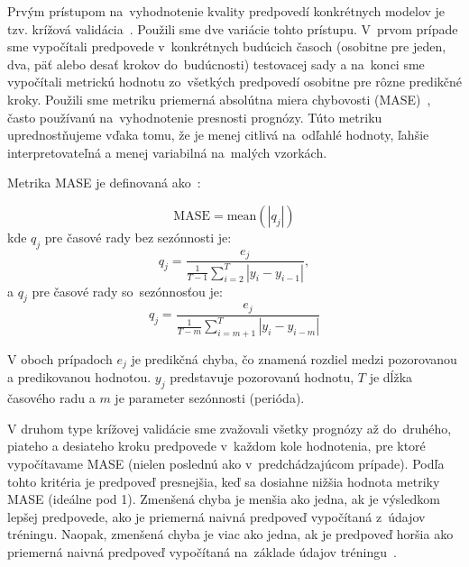 \documentclass[thesismargins, thesislinespacing, openright, upjsfrontpage]{rnthesis}
\begin{document}

Prvým prístupom na~vyhodnotenie kvality predpovedí konkrétnych modelov je tzv. krížová validácia~\cite {hyndman2018forecasting}. Použili sme dve variácie tohto prístupu. V~prvom prípade sme vypočítali predpovede v~konkrétnych budúcich časoch (osobitne pre jeden, dva, päť alebo desať krokov do~budúcnosti) testovacej sady a na~konci sme vypočítali metrickú hodnotu zo~všetkých predpovedí osobitne pre rôzne predikčné kroky. Použili sme metriku priemerná absolútna miera chybovosti (MASE)~\cite{hyndman2006another}, často používanú na~vyhodnotenie presnosti prognózy. Túto metriku uprednostňujeme vďaka tomu, že je menej citlivá na~odľahlé hodnoty, ľahšie interpretovateľná a menej variabilná na~malých vzorkách.

Metrika MASE je definovaná ako~\cite{hyndman2018forecasting}:

% 
\begin{equation}
\textrm{MASE} = \textrm{mean}(|q_j|)
\end{equation}
% 
kde $q_j$ pre časové rady bez sezónnosti je:
% 
\begin{equation} 
q_j= \frac{e_j}{\frac{1}{T-1} \sum_{i=2}^{T}|y_i - y_{i-1}|},
\end{equation}
% 
a $q_j$ pre časové rady so~sezónnosťou je:
% 
\begin{equation} 
q_j = \frac{e_j}{\frac{1}{T-m} \sum_{i=m+1}^{T}|y_i - y_{i-m}|}
\end{equation}

V oboch prípadoch $e_j$ je predikčná chyba, čo znamená rozdiel medzi pozorovanou a predikovanou hodnotou. $y_j$ predstavuje pozorovanú hodnotu, $T$ je dĺžka časového radu a $m$ je parameter sezónnosti (perióda).

V druhom type krížovej validácie sme zvažovali všetky prognózy až do~druhého, piateho a desiateho kroku predpovede v~každom kole hodnotenia, pre ktoré vypočítavame MASE (nielen poslednú ako v~predchádzajúcom prípade). Podľa tohto kritéria je predpoveď presnejšia, keď sa dosiahne nižšia hodnota metriky MASE (ideálne pod 1). Zmenšená chyba je menšia ako jedna, ak je výsledkom lepšej predpovede, ako je priemerná naivná predpoveď vypočítaná z~údajov tréningu. Naopak, zmenšená chyba je viac ako jedna, ak je predpoveď horšia ako priemerná naivná predpoveď vypočítaná na~základe údajov tréningu~\cite{hyndman2014measuring}.
\end{document}

